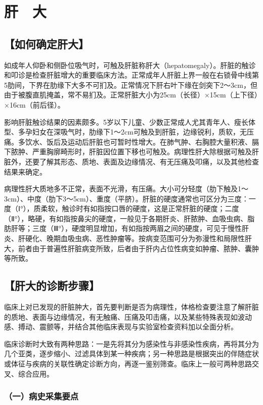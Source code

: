 \chapter{肝　大}

\section{【如何确定肝大】}

如成年人仰卧和侧卧位吸气时，可触及肝脏称肝大（hepatomegaly）。肝脏的触诊和叩诊是检查肝脏增大的重要临床方法。正常成年人肝脏上界一般在右锁骨中线第5肋间，下界在肋缘下大多不可扪及。正常情况下肝右叶下缘在剑突下2～3cm，但由于被腹直肌掩盖，常不易扪及。正常肝脏大小为25cm（长径）×15cm（上下径）×16cm（前后径）。

影响肝脏触诊结果的因素颇多。5岁以下儿童、少数正常成人尤其青年人、瘦长体型、多孕妇女在深吸气时，肋缘下1～2cm可触及到肝脏，边缘锐利，质软，无压痛。多饮水、饭后及运动后肝脏也可暂时性增大。在肺气肿、右胸腔大量积液、膈下脓肿、严重胸廓畸形时，肝脏因位置下移也可触及。病理性肝大除根据可触及肝脏外，还要了解其形态、质地、表面及边缘情况、有无压痛及叩痛，以及其他检查结果来确定。

病理性肝大质地多不正常，表面不光滑，有压痛。大小可分轻度（肋下触及1～3cm）、中度（肋下3～5cm）、重度（平脐）。肝脏的硬度通常也可区分为三度：一度（Ⅰ°），质柔软，触诊时有如指按口唇的硬度，这是正常肝脏的硬度；二度（Ⅱ°），略硬，有如指按鼻尖的硬度，一般见于各期肝炎、肝脓肿、血吸虫病、脂肪肝等；三度（Ⅲ°），硬度明显增加，有如指按两眉之间的硬度，可见于慢性肝炎、肝硬化、晚期血吸虫病、恶性肿瘤等。按病变范围可分为弥漫性和局限性肝大，前者由于普遍性肝脏病变所致，后者由于肝内占位性病变如肿瘤、脓肿、囊肿等所致。

\section{【肝大的诊断步骤】}

临床上对已发现的肝脏肿大，首先要判断是否为病理性，体格检查要注意了解肝脏的质地、表面与边缘情况，有无触痛、压痛及叩击痛，以及某些特殊表现如波动感、搏动、震颤等，并结合其他临床表现与实验室检查资料加以全面分析。

临床诊断时大致有两种思路：一是先将其分为感染性与非感染性疾病，再将其分为几个亚类，逐步缩小、过滤具体到某一种疾病；另一种思路是根据突出的伴随症状或体征与疾病的关联性确定诊断方向，再逐一鉴别筛查。临床上一般可两种思路交叉、综合应用。

\subsection{（一）病史采集要点}

